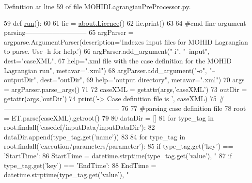 Definition at line 59 of file M\+O\+H\+I\+D\+Lagrangian\+Pre\+Processor.\+py.


\begin{DoxyCode}
59 \textcolor{keyword}{def }\mbox{\hyperlink{namespace_m_o_h_i_d_lagrangian_pre_processor_a0e4b5abe6bc6cf76f0ed898743e538f3}{run}}():
60     
61     lic = \mbox{\hyperlink{classabout_1_1_licence}{about.Licence}}()
62     lic.print()
63     
64     \textcolor{comment}{#cmd line argument parsing---------------------------}
65     argParser = argparse.ArgumentParser(description=\textcolor{stringliteral}{'Indexes input files for MOHID Lagrangian to parse. Use
       -h for help.'})
66     argParser.add\_argument(\textcolor{stringliteral}{"-i"}, \textcolor{stringliteral}{"--input"}, dest=\textcolor{stringliteral}{"caseXML"},
67                     help=\textcolor{stringliteral}{".xml file with the case definition for the MOHID Lagrangian run"}, metavar=\textcolor{stringliteral}{".xml"})
68     argParser.add\_argument(\textcolor{stringliteral}{"-o"}, \textcolor{stringliteral}{"--outputDir"}, dest=\textcolor{stringliteral}{"outDir"},
69                     help=\textcolor{stringliteral}{"output directory"}, metavar=\textcolor{stringliteral}{".xml"})
70     args = argParser.parse\_args()
71     
72     caseXML = getattr(args,\textcolor{stringliteral}{'caseXML'})
73     outDir = getattr(args,\textcolor{stringliteral}{'outDir'})
74     print(\textcolor{stringliteral}{'-> Case definition file is '}, caseXML)
75     \textcolor{comment}{#---------------------------------------------------}
76     
77     \textcolor{comment}{#parsing case definition file}
78     root = ET.parse(caseXML).getroot()
79     
80     dataDir = []
81     \textcolor{keywordflow}{for} type\_tag \textcolor{keywordflow}{in} root.findall(\textcolor{stringliteral}{'casedef/inputData/inputDataDir'}):
82         dataDir.append(type\_tag.get(\textcolor{stringliteral}{'name'}))
83     
84     \textcolor{keywordflow}{for} type\_tag \textcolor{keywordflow}{in} root.findall(\textcolor{stringliteral}{'execution/parameters/parameter'}):
85         \textcolor{keywordflow}{if} type\_tag.get(\textcolor{stringliteral}{'key'}) == \textcolor{stringliteral}{'StartTime'}:
86             StartTime = datetime.strptime(type\_tag.get(\textcolor{stringliteral}{'value'}), \textcolor{stringliteral}{"%
87         \textcolor{keywordflow}{if} type\_tag.get(\textcolor{stringliteral}{'key'}) == \textcolor{stringliteral}{'EndTime'}:
88             EndTime = datetime.strptime(type\_tag.get(\textcolor{stringliteral}{'value'}), \textcolor{stringliteral}{"%
}}
\end{DoxyCode}
